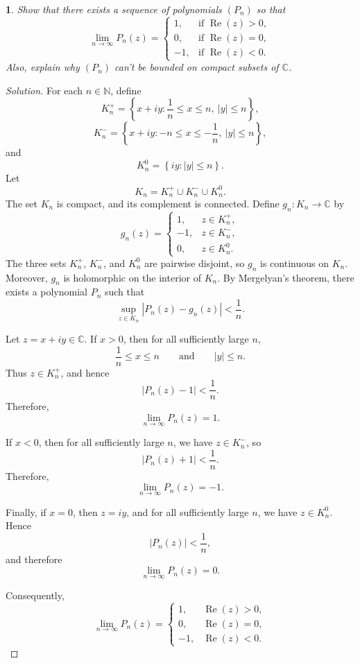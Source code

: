 \documentclass[12pt, a4paper]{report}
\theoremstyle{spaced}
\newtheorem{exercise}{}
\begin{document}
\begin{exercise}
	Show that there exists a sequence of polynomials $(P_n)$ so that
	\[
		\lim_{n\to\infty} P_n(z)=
		\begin{cases}
			1,  & \text{if } \operatorname{Re}(z)>0, \\
			0,  & \text{if } \operatorname{Re}(z)=0, \\
			-1, & \text{if } \operatorname{Re}(z)<0.
		\end{cases}
	\]
	Also, explain why $(P_n)$ can't be bounded on compact subsets of $\mathbb{C}$.
\end{exercise}
\begin{proof}[Solution]
	For each \(n\in\mathbb{N}\), define
	\[
		K_n^+
		=
		\left\{
		x+iy:\frac{1}{n}\leq x\leq n,\ |y|\leq n
		\right\},
	\]
	\[
		K_n^-
		=
		\left\{
		x+iy:-n\leq x\leq-\frac{1}{n},\ |y|\leq n
		\right\},
	\]
	and
	\[
		K_n^0
		=
		\left\{
		iy:|y|\leq n
		\right\}.
	\]
	Let
	\[
		K_n=K_n^+\cup K_n^-\cup K_n^0.
	\]
	The set \(K_n\) is compact, and its complement is connected. Define
	\(g_n:K_n\to\mathbb{C}\) by
	\[
		g_n(z)
		=
		\begin{cases}
			1,  & z\in K_n^+, \\
			-1, & z\in K_n^-, \\
			0,  & z\in K_n^0.
		\end{cases}
	\]
	The three sets \(K_n^+\), \(K_n^-\), and \(K_n^0\) are pairwise
	disjoint, so \(g_n\) is continuous on \(K_n\). Moreover, \(g_n\) is
	holomorphic on the interior of \(K_n\).
	By Mergelyan's theorem, there exists a polynomial \(P_n\) such that
	\[
		\sup_{z\in K_n}|P_n(z)-g_n(z)|<\frac{1}{n}.
	\]

	Let \(z=x+iy\in\mathbb{C}\). If \(x>0\), then for all sufficiently large
	\(n\),
	\[
		\frac{1}{n}\leq x\leq n
		\qquad\text{and}\qquad
		|y|\leq n.
	\]
	Thus \(z\in K_n^+\), and hence
	\[
		|P_n(z)-1|<\frac{1}{n}.
	\]
	Therefore,
	\[
		\lim_{n\to\infty}P_n(z)=1.
	\]

	If \(x<0\), then for all sufficiently large \(n\), we have
	\(z\in K_n^-\), so
	\[
		|P_n(z)+1|<\frac{1}{n}.
	\]
	Therefore,
	\[
		\lim_{n\to\infty}P_n(z)=-1.
	\]

	Finally, if \(x=0\), then \(z=iy\), and for all sufficiently large
	\(n\), we have \(z\in K_n^0\). Hence
	\[
		|P_n(z)|<\frac{1}{n},
	\]
	and therefore
	\[
		\lim_{n\to\infty}P_n(z)=0.
	\]

	Consequently,
	\[
		\lim_{n\to\infty}P_n(z)
		=
		\begin{cases}
			1,  & \operatorname{Re}(z)>0, \\
			0,  & \operatorname{Re}(z)=0, \\
			-1, & \operatorname{Re}(z)<0.
		\end{cases}
	\]


\end{proof}
\end{document}
